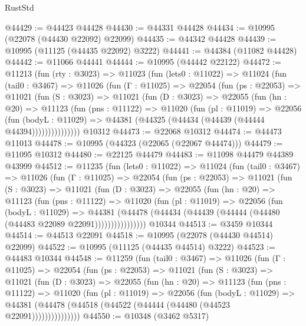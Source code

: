 \begin{lexlean}{RustStd}
\begin{coremodule}
@44429 := @44423 @44428
@44430 := @44331 @44428
@44434 := @10995 (@22078 (@44430 @22092) @22099)
@44435 := @44342 @44428
@44439 := @10995 (@11125 (@44435 @22092) @3222)
@44441 := @44384 (@11082 @44428)
@44442 := @11066 @44441
@44444 := @10995 (@44442 @22122)
@44472 := @11213
    (fun (rty : @3023) =>
    @11023
      (fun (lets0 : @11022) =>
      @11024
        (fun (tail0 : @3467) =>
        @11026
          (fun (Γ : @11025) =>
          @22054
            (fun (ps : @22053) =>
            @11021
              (fun (S : @3023) =>
              @11021
                (fun (D : @3023) =>
                @22055
                  (fun (hn : @20) =>
                  @11123
                    (fun (pns : @11122) =>
                    @11020
                      (fun (pl : @11019) =>
                      @22056
                        (fun (bodyL : @11029) =>
                        @44381 (@44325 (@44434 (@44439 (@44444 @44394)))))))))))))))
    @10312
@44473 := @22068 @10312
@44474 := @44473 @11013
@44478 := @10995 (@44323 (@22065 (@22067 @44474)))
@44479 := @11095 @10312
@44480 := @22125 @44479
@44483 := @11098 @44479 @44389 @43999
@44512 := @11235
    (fun (lets0 : @11022) =>
    @11024
      (fun (tail0 : @3467) =>
      @11026
        (fun (Γ : @11025) =>
        @22054
          (fun (ps : @22053) =>
          @11021
            (fun (S : @3023) =>
            @11021
              (fun (D : @3023) =>
              @22055
                (fun (hn : @20) =>
                @11123
                  (fun (pns : @11122) =>
                  @11020
                    (fun (pl : @11019) =>
                    @22056
                      (fun (bodyL : @11029) =>
                      @44381
                        (@44478
                          (@44434 (@44439 (@44444 (@44480 (@44483 @22089 @22091))))))))))))))))
    @10344
@44513 := @3459 @10344
@44514 := @44513 @22091
@44518 := @10995 (@22078 (@44430 @44514) @22099)
@44522 := @10995 (@11125 (@44435 @44514) @3222)
@44523 := @44483 @10344
@44548 := @11259
    (fun (tail0 : @3467) =>
    @11026
      (fun (Γ : @11025) =>
      @22054
        (fun (ps : @22053) =>
        @11021
          (fun (S : @3023) =>
          @11021
            (fun (D : @3023) =>
            @22055
              (fun (hn : @20) =>
              @11123
                (fun (pns : @11122) =>
                @11020
                  (fun (pl : @11019) =>
                  @22056
                    (fun (bodyL : @11029) =>
                    @44381 (@44478 (@44518 (@44522 (@44444 (@44480 (@44523 @22091)))))))))))))))
@44550 := @10348 (@3462 @5317)

\end{coremodule}
\end{lexlean}
